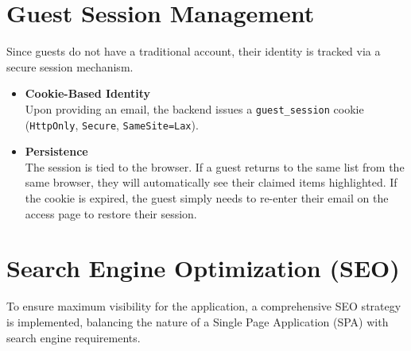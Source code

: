 \section{Guest Session Management}
Since guests do not have a traditional account, their identity is tracked via a secure session mechanism.

\begin{itemize}
    \item \textbf{Cookie-Based Identity} \\
        Upon providing an email, the backend issues a \texttt{guest\_session} cookie (\texttt{HttpOnly}, \texttt{Secure}, \texttt{SameSite=Lax}).
    \item \textbf{Persistence} \\
        The session is tied to the browser. If a guest returns to the same list from the same browser, they will automatically see their claimed items highlighted. If the cookie is expired, the guest simply needs to re-enter their email on the access page to restore their session.
\end{itemize}

\section{Search Engine Optimization (SEO)}
To ensure maximum visibility for the application, a comprehensive SEO strategy is implemented, balancing the nature of a Single Page Application (SPA) with search engine requirements.

